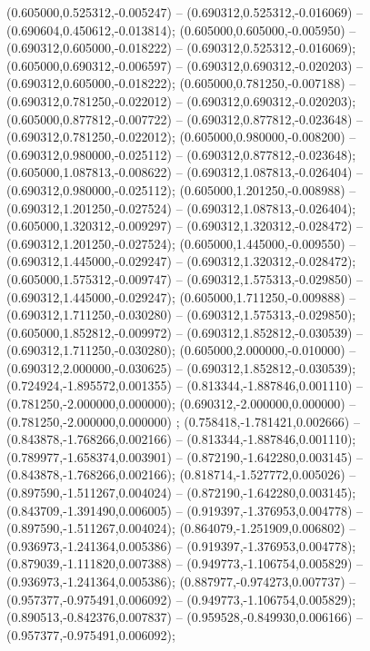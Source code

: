  (0.605000,0.525312,-0.005247) -- (0.690312,0.525312,-0.016069) -- (0.690604,0.450612,-0.013814);
 (0.605000,0.605000,-0.005950) -- (0.690312,0.605000,-0.018222) -- (0.690312,0.525312,-0.016069);
 (0.605000,0.690312,-0.006597) -- (0.690312,0.690312,-0.020203) -- (0.690312,0.605000,-0.018222);
 (0.605000,0.781250,-0.007188) -- (0.690312,0.781250,-0.022012) -- (0.690312,0.690312,-0.020203);
 (0.605000,0.877812,-0.007722) -- (0.690312,0.877812,-0.023648) -- (0.690312,0.781250,-0.022012);
 (0.605000,0.980000,-0.008200) -- (0.690312,0.980000,-0.025112) -- (0.690312,0.877812,-0.023648);
 (0.605000,1.087813,-0.008622) -- (0.690312,1.087813,-0.026404) -- (0.690312,0.980000,-0.025112);
 (0.605000,1.201250,-0.008988) -- (0.690312,1.201250,-0.027524) -- (0.690312,1.087813,-0.026404);
 (0.605000,1.320312,-0.009297) -- (0.690312,1.320312,-0.028472) -- (0.690312,1.201250,-0.027524);
 (0.605000,1.445000,-0.009550) -- (0.690312,1.445000,-0.029247) -- (0.690312,1.320312,-0.028472);
 (0.605000,1.575312,-0.009747) -- (0.690312,1.575313,-0.029850) -- (0.690312,1.445000,-0.029247);
 (0.605000,1.711250,-0.009888) -- (0.690312,1.711250,-0.030280) -- (0.690312,1.575313,-0.029850);
 (0.605000,1.852812,-0.009972) -- (0.690312,1.852812,-0.030539) -- (0.690312,1.711250,-0.030280);
 (0.605000,2.000000,-0.010000) -- (0.690312,2.000000,-0.030625) -- (0.690312,1.852812,-0.030539);
 (0.724924,-1.895572,0.001355) -- (0.813344,-1.887846,0.001110) -- (0.781250,-2.000000,0.000000);
 (0.690312,-2.000000,0.000000) -- (0.781250,-2.000000,0.000000) ;
 (0.758418,-1.781421,0.002666) -- (0.843878,-1.768266,0.002166) -- (0.813344,-1.887846,0.001110);
 (0.789977,-1.658374,0.003901) -- (0.872190,-1.642280,0.003145) -- (0.843878,-1.768266,0.002166);
 (0.818714,-1.527772,0.005026) -- (0.897590,-1.511267,0.004024) -- (0.872190,-1.642280,0.003145);
 (0.843709,-1.391490,0.006005) -- (0.919397,-1.376953,0.004778) -- (0.897590,-1.511267,0.004024);
 (0.864079,-1.251909,0.006802) -- (0.936973,-1.241364,0.005386) -- (0.919397,-1.376953,0.004778);
 (0.879039,-1.111820,0.007388) -- (0.949773,-1.106754,0.005829) -- (0.936973,-1.241364,0.005386);
 (0.887977,-0.974273,0.007737) -- (0.957377,-0.975491,0.006092) -- (0.949773,-1.106754,0.005829);
 (0.890513,-0.842376,0.007837) -- (0.959528,-0.849930,0.006166) -- (0.957377,-0.975491,0.006092);
